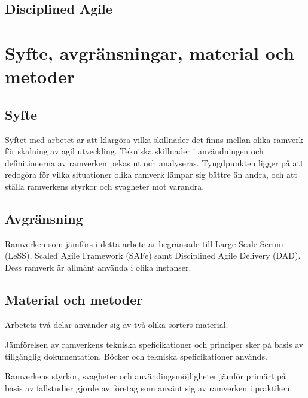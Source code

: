 \subsection{Disciplined Agile}


	
\newpage

\section{Syfte, avgränsningar, material och metoder}


\subsection{Syfte}

Syftet med arbetet är att klargöra vilka skillnader det finns mellan olika ramverk för skalning av agil utveckling. Tekniska skillnader i användningen och definitionerna av ramverken pekas ut och analyseras.
Tyngdpunkten ligger på att redogöra för vilka situationer olika ramverk lämpar sig bättre än andra, och att ställa ramverkens styrkor och svagheter mot varandra.



\subsection{Avgränsning}

Ramverken som jämförs i detta arbete är begränsade till Large Scale Scrum (LeSS), Scaled Agile Framework (SAFe) samt Disciplined Agile Delivery (DAD).
Dess ramverk är allmänt använda i olika instanser.




\subsection{Material och metoder}
Arbetets två delar använder sig av två olika sorters material.

Jämförelsen av ramverkens tekniska speficikationer och principer sker på basis av tillgänglig dokumentation. Böcker och tekniska speficikationer används.


Ramverkens styrkor, svagheter och användingsmöjligheter jämför primärt på basis av fallstudier gjorde av företag som använt sig av ramverken i praktiken.

